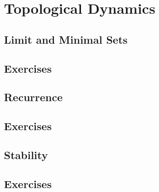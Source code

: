 \chapter{Topological Dynamics}
\section{Limit and Minimal Sets}
\section*{Exercises}
\section{Recurrence}
\section*{Exercises}
\section{Stability}
\section*{Exercises}


